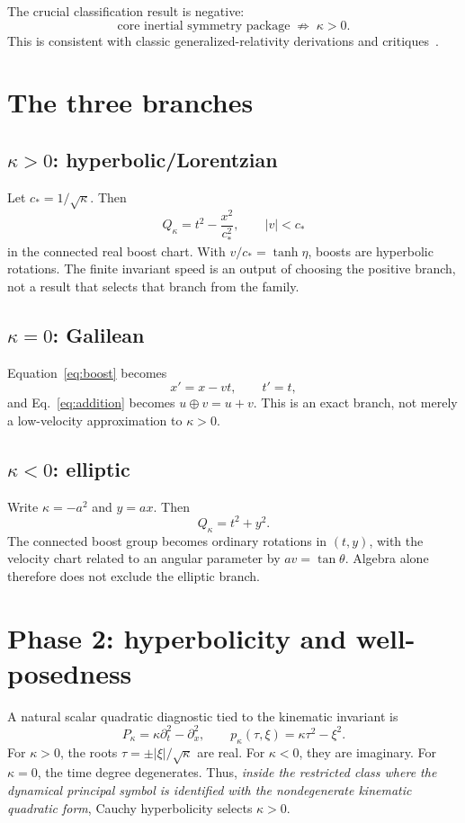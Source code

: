 \documentclass[11pt,a4paper]{article}
\newcommand{\kap}{\kappa}
\newcommand{\cstar}{c_{\!*}}
\begin{document}
The crucial classification result is negative:
\begin{equation}
\boxed{\text{core inertial symmetry package}\;\not\Rightarrow\;\kap>0.}
\end{equation}
This is consistent with classic generalized-relativity derivations and critiques~\cite{berzi1969,bacry1968,pelissetto2015,drory2015}.

\section{The three branches}
\subsection{$\kap>0$: hyperbolic/Lorentzian}
Let $\cstar=1/\sqrt{\kap}$.  Then
\[
Q_\kap=t^2-\frac{x^2}{\cstar^2},\qquad |v|<\cstar
\]
in the connected real boost chart.  With $v/\cstar=\tanh\eta$, boosts are hyperbolic rotations.  The finite invariant speed is an output of choosing the positive branch, not a result that selects that branch from the family.

\subsection{$\kap=0$: Galilean}
Equation~\eqref{eq:boost} becomes
\[
x'=x-vt,\qquad t'=t,
\]
and Eq.~\eqref{eq:addition} becomes $u\oplus v=u+v$.  This is an exact branch, not merely a low-velocity approximation to $\kap>0$.

\subsection{$\kap<0$: elliptic}
Write $\kap=-a^2$ and $y=ax$.  Then
\[
Q_\kap=t^2+y^2.
\]
The connected boost group becomes ordinary rotations in $(t,y)$, with the velocity chart related to an angular parameter by $av=\tan\theta$.  Algebra alone therefore does not exclude the elliptic branch.

\section{Phase 2: hyperbolicity and well-posedness}
A natural scalar quadratic diagnostic tied to the kinematic invariant is
\begin{equation}
P_\kap=\kap\partial_t^2-\partial_x^2,
\qquad
p_\kap(\tau,\xi)=\kap\tau^2-\xi^2.
\label{eq:principal}
\end{equation}
For $\kap>0$, the roots $\tau=\pm |\xi|/\sqrt{\kap}$ are real.  For $\kap<0$, they are imaginary.  For $\kap=0$, the time degree degenerates.  Thus, \emph{inside the restricted class where the dynamical principal symbol is identified with the nondegenerate kinematic quadratic form}, Cauchy hyperbolicity selects $\kap>0$.
\end{document}
